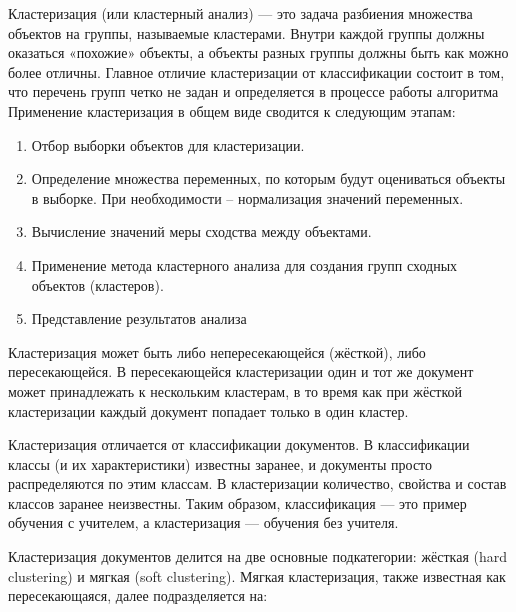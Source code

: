 \teory %

Кластеризация (или кластерный анализ) — это задача разбиения множества объектов на группы, называемые кластерами. Внутри каждой группы должны оказаться «похожие» объекты, а объекты разных группы должны быть как можно более отличны. Главное отличие кластеризации от классификации состоит в том, что перечень групп четко не задан и определяется в процессе работы алгоритма
Применение кластеризация в общем виде сводится к следующим этапам:
\begin{enumerate}[label=\arabic*.]
\item Отбор выборки объектов для кластеризации.

\item Определение множества переменных, по которым будут оцениваться объекты в выборке. При необходимости – нормализация значений переменных.

\item Вычисление значений меры сходства между объектами.

\item Применение метода кластерного анализа для создания групп сходных объектов (кластеров).
	
\item Представление результатов анализа
		
	\end{enumerate}

Кластеризация может быть либо непересекающейся (жёсткой), либо пересекающейся. В пересекающейся кластеризации один и тот же документ может принадлежать к нескольким кластерам, в то время как при жёсткой кластеризации каждый документ попадает только в один кластер.

Кластеризация отличается от классификации документов. В классификации классы (и их характеристики) известны заранее, и документы просто распределяются по этим классам. В кластеризации количество, свойства и состав классов заранее неизвестны. Таким образом, классификация — это пример обучения с учителем, а кластеризация — обучения без учителя.

Кластеризация документов делится на две основные подкатегории: жёсткая (hard clustering) и мягкая (soft clustering). Мягкая кластеризация, также известная как пересекающаяся, далее подразделяется на:

    

